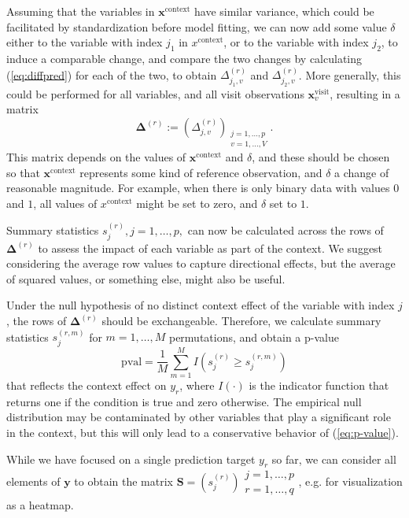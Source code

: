 \documentclass[AMA,Times1COL]{WileyNJDv5} %
\begin{document}
Assuming that the variables in $\mathbf{x}^{\mathrm{context}}$ have similar variance, which could be facilitated by standardization before model fitting, we can now add some value $\delta$ either to the variable with index $j_1$ in $x^{\mathrm{context}}$, or to the variable with index $j_2$, to induce a comparable change, and compare the two changes by calculating (\ref{eq:diffpred}) for each of the two, to obtain $\Delta_{j_1,v}^{(r)}$ and $\Delta_{j_2, v}^{(r)}$. More generally, this could be performed for all variables, and all visit observations ${\mathbf{x}^{\mathrm{visit}}_{v}}$, resulting in a matrix
\begin{equation}\label{eq:diffmat}
\boldsymbol{\Delta}^{(r)} := \left( \Delta^{(r)}_{j, v} \right)_{\substack{j=1, \ldots, p \\ v=1, \ldots, V}}.
\end{equation}
This matrix depends on the values of $\mathbf{x}^{\mathrm{context}}$ and $\delta$, and these should be chosen so that $\mathbf{x}^{\mathrm{context}}$ represents some kind of reference observation, and $\delta$ a change of reasonable magnitude. For example, when there is only binary data with values $0$ and $1$, all values of $x^{\mathrm{context}}$ might be set to zero, and $\delta$ set to $1$.

Summary statistics $s_j^{(r)}, j=1,\ldots,p,$ can now be calculated across the rows of $\boldsymbol{\Delta}^{(r)}$ to assess the impact of each variable as part of the context. We suggest considering the average row values to capture directional effects, but the average of squared values, or something else, might also be useful. 

Under the null hypothesis of no distinct context effect of the variable with index $j$, the rows of $\boldsymbol{\Delta}^{(r)}$ should be exchangeable. Therefore, we calculate summary statistics $s_j^{(r,m)}$ for $m=1,\ldots,M$ permutations, and obtain a p-value
\begin{equation}
\text{pval} = \frac{1}{M}
\sum_{m=1}^{M} I\left(s_j^{(r)} \geq s_j^{(r,m)}\right)
\label{eq:p-value}
\end{equation}
that reflects the context effect on $y_r$, where \(I(\cdot)\) is the indicator function that returns one if the condition is true and zero otherwise. The empirical null distribution may be contaminated by other variables that play a significant role in the context, but this will only lead to a conservative behavior of (\ref{eq:p-value}).

While we have focused on a single prediction target $y_r$ so far, we can consider all elements of $\mathbf{y}$ to obtain the matrix
\(\mathbf{S} =
\left( s_{j}^{(r)} \right)
\substack{j = 1, \ldots, p \\ r = 1, \ldots, q}\), e.g. for visualization as a heatmap.
\end{document}
